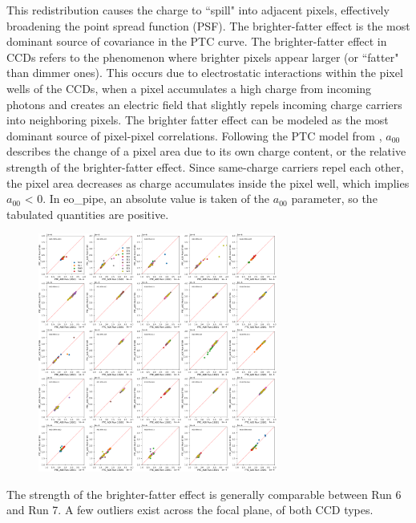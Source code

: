 This redistribution causes the charge to ``spill" into adjacent pixels, effectively broadening the point spread function (PSF). The brighter-fatter effect is the most dominant source of covariance in the PTC curve. The brighter-fatter effect in CCDs refers to the phenomenon where brighter pixels appear larger (or ``fatter" than dimmer ones). This occurs due to electrostatic interactions within the pixel wells of the CCDs, when a pixel accumulates a high charge from incoming photons and creates an electric field that slightly repels incoming charge carriers into neighboring pixels. The brighter fatter effect can be modeled as the most dominant source of pixel-pixel correlations. Following the PTC model from %
\citet{2019A&A...629A..36A}, $a_{00}$ describes the change of a pixel area due to its own charge content, or the relative strength of the brighter-fatter effect. Since same-charge carriers repel each other, the pixel area decreases as charge accumulates inside the pixel well, which implies $a_{00}$ \textless{} 0. In eo\_pipe, an absolute value is taken of the $a_{00}$ parameter, so the tabulated quantities are positive.

\begin{figure}[H]
\begin{centering}
\includegraphics[width=0.7\textwidth]{sections/figures/baselineCharacterization/13591_E749_PTC_A00.png}
\end{centering}
\end{figure}

The strength of the brighter-fatter effect is generally comparable between Run 6 and Run 7. A few outliers exist across the
focal plane, of both CCD types.

